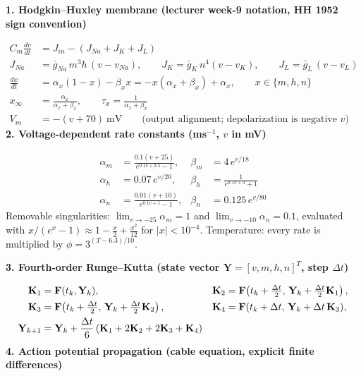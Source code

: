 \documentclass[border=14pt,varwidth=18cm]{standalone}
\begin{document}
\setlength{\parindent}{0pt}
{\large\bfseries\color{head} 1. Hodgkin--Huxley membrane (lecturer week-9 notation, HH 1952 sign convention)}\par\medskip
\begin{align}
C_m\frac{dv}{dt} &= J_{in} - \left(J_{Na}+J_K+J_L\right) \\
J_{Na} &= \bar g_{Na}\,m^{3}h\,(v-v_{Na}),\qquad
J_{K} = \bar g_{K}\,n^{4}(v-v_{K}),\qquad
J_{L} = \bar g_{L}\,(v-v_{L}) \\
\frac{dx}{dt} &= \alpha_x(1-x)-\beta_x x = -x(\alpha_x+\beta_x)+\alpha_x,\qquad x\in\{m,h,n\} \\
x_\infty &= \frac{\alpha_x}{\alpha_x+\beta_x},\qquad \tau_x=\frac{1}{\alpha_x+\beta_x} \\
V_m &= -(v+70)\ \text{mV}\qquad\text{(output alignment; depolarization is negative } v\text{)}
\end{align}
{\large\bfseries\color{head} 2. Voltage-dependent rate constants (ms$^{-1}$, $v$ in mV)}\par\medskip
\begin{align}
\alpha_m &= \frac{0.1(v+25)}{e^{0.1v+2.5}-1}, & \beta_m &= 4\,e^{v/18} \\
\alpha_h &= 0.07\,e^{v/20}, & \beta_h &= \frac{1}{e^{0.1v+3}+1} \\
\alpha_n &= \frac{0.01(v+10)}{e^{0.1v+1}-1}, & \beta_n &= 0.125\,e^{v/80}
\end{align}
Removable singularities: $\lim_{v\to-25}\alpha_m=1$ and $\lim_{v\to-10}\alpha_n=0.1$, evaluated with
$x/(e^{x}-1)\approx 1-\tfrac{x}{2}+\tfrac{x^{2}}{12}$ for $|x|<10^{-4}$. Temperature: every rate is multiplied by
$\phi=3^{(T-6.3)/10}$.\par\bigskip
{\large\bfseries\color{head} 3. Fourth-order Runge--Kutta (state vector $\mathbf{Y}=[v,m,h,n]^{T}$, step $\Delta t$)}\par\medskip
\begin{align}
\mathbf{K}_1 &= \mathbf{F}(t_k,\mathbf{Y}_k), &
\mathbf{K}_2 &= \mathbf{F}\!\left(t_k+\tfrac{\Delta t}{2},\,\mathbf{Y}_k+\tfrac{\Delta t}{2}\mathbf{K}_1\right), \\
\mathbf{K}_3 &= \mathbf{F}\!\left(t_k+\tfrac{\Delta t}{2},\,\mathbf{Y}_k+\tfrac{\Delta t}{2}\mathbf{K}_2\right), &
\mathbf{K}_4 &= \mathbf{F}(t_k+\Delta t,\,\mathbf{Y}_k+\Delta t\,\mathbf{K}_3), \\
\mathbf{Y}_{k+1} &= \mathbf{Y}_k+\frac{\Delta t}{6}\left(\mathbf{K}_1+2\mathbf{K}_2+2\mathbf{K}_3+\mathbf{K}_4\right) \notag
\end{align}
{\large\bfseries\color{head} 4. Action potential propagation (cable equation, explicit finite differences)}\par\medskip
\end{document}
